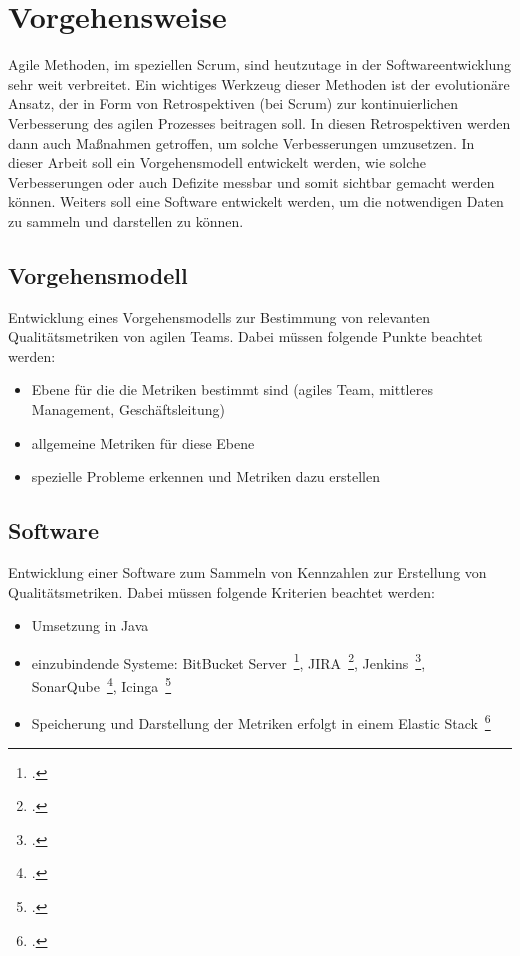 \chapter{Vorgehensweise}

Agile Methoden, im speziellen Scrum, sind heutzutage in der Softwareentwicklung sehr weit verbreitet.
Ein wichtiges Werkzeug dieser Methoden ist der evolutionäre Ansatz, der in Form von Retrospektiven (bei Scrum) zur kontinuierlichen Verbesserung des agilen Prozesses beitragen soll.
In diesen Retrospektiven werden dann auch Maßnahmen getroffen, um solche Verbesserungen umzusetzen.
In dieser Arbeit soll ein Vorgehensmodell entwickelt werden, wie solche Verbesserungen oder auch Defizite messbar und somit sichtbar gemacht werden können.
Weiters soll eine Software entwickelt werden, um die notwendigen Daten zu sammeln und darstellen zu können.

\section{Vorgehensmodell}

Entwicklung eines Vorgehensmodells zur Bestimmung von relevanten Qualitätsmetriken von agilen Teams.
Dabei müssen folgende Punkte beachtet werden:
\begin{itemize}[noitemsep]
    \item Ebene für die die Metriken bestimmt sind (agiles Team, mittleres Management, Geschäftsleitung)
    \item allgemeine Metriken für diese Ebene
    \item spezielle Probleme erkennen und Metriken dazu erstellen
\end{itemize}

\section{Software}\label{vorgehen:software}

Entwicklung einer Software zum Sammeln von Kennzahlen zur Erstellung von Qualitätsmetriken. 
Dabei müssen folgende Kriterien beachtet werden:
\begin{itemize}[noitemsep]
    \item Umsetzung in Java
    \item einzubindende Systeme: BitBucket Server~\footcite{bitbucket_server}, JIRA~\footcite{jira}, Jenkins~\footcite{jenkins}, SonarQube~\footcite{sonarqube}, Icinga~\footcite{icinga}
    \item Speicherung und Darstellung der Metriken erfolgt in einem Elastic Stack~\footcite{elastic_stack}
\end{itemize}
